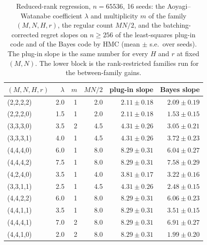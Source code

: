 \documentclass[11pt,a4paper]{article}
\begin{document}
\begin{table}[t]
\centering
\footnotesize
\caption{Reduced-rank regression, $n=65536$, 16 seeds: the Aoyagi--Watanabe coefficient $\lambda$ and multiplicity $m$ of the family $(M,N,H,r)$, the regular count $MN/2$, and the batching-corrected regret slopes on $n\ge256$ of the least-squares plug-in code and of the Bayes code by HMC (mean $\pm$ s.e.\ over seeds). The plug-in slope is the same number for every $H$ and $r$ at fixed $(M,N)$. The lower block is the rank-restricted families run for the between-family gains.}
\label{tab:rrr}
\begin{tabular}{lrrrrr}
\toprule
$(M,N,H,r)$ & $\lambda$ & $m$ & $MN/2$ & plug-in slope & Bayes slope \\
\midrule
(2,2,2,2) & 2.0 & 1 & 2.0 & $2.11\pm0.18$ & $2.09\pm0.19$ \\
(2,2,2,0) & 1.5 & 1 & 2.0 & $2.11\pm0.18$ & $1.53\pm0.15$ \\
(3,3,3,0) & 3.5 & 2 & 4.5 & $4.31\pm0.26$ & $3.05\pm0.21$ \\
(3,3,3,1) & 4.0 & 1 & 4.5 & $4.31\pm0.26$ & $3.72\pm0.23$ \\
(4,4,4,0) & 6.0 & 1 & 8.0 & $8.29\pm0.31$ & $6.04\pm0.27$ \\
(4,4,4,2) & 7.5 & 1 & 8.0 & $8.29\pm0.31$ & $7.58\pm0.29$ \\
(4,2,4,0) & 3.5 & 1 & 4.0 & $3.81\pm0.17$ & $3.22\pm0.16$ \\
\midrule
(3,3,1,1) & 2.5 & 1 & 4.5 & $4.31\pm0.26$ & $2.48\pm0.15$ \\
(4,4,2,2) & 6.0 & 1 & 8.0 & $8.29\pm0.31$ & $6.06\pm0.23$ \\
(4,4,1,1) & 3.5 & 1 & 8.0 & $8.29\pm0.31$ & $3.51\pm0.15$ \\
(4,4,4,1) & 7.0 & 2 & 8.0 & $8.29\pm0.31$ & $6.91\pm0.27$ \\
(4,4,1,0) & 2.0 & 2 & 8.0 & $8.29\pm0.31$ & $1.99\pm0.20$ \\
\bottomrule
\end{tabular}
\end{table}
\end{document}
